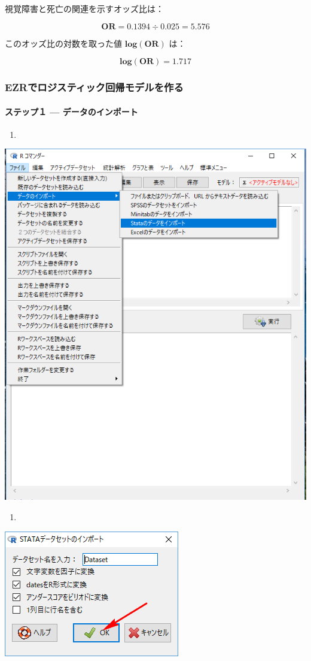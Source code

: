 \documentclass[11pt,]{problemset}
\let\oldparagraph\paragraph
\renewcommand{\paragraph}[1]{\oldparagraph{#1}\mbox{}}
\begin{document}
視覚障害と死亡の関連を示すオッズ比は：

\[
\mathbf{OR} = 0.1394 \div 0.025 = 5.576
\]

このオッズ比の対数を取った値 \(\mathbf{log(OR)}\) は：

\[
\mathbf{log(OR)} = 1.717
\]

\hypertarget{ezr}{%
\subsubsection{EZRでロジスティック回帰モデルを作る}\label{ezr}}

\hypertarget{-}{%
\paragraph{ステップ１ --- データのインポート}\label{-}}

\begin{enumerate}
\def\labelenumi{\arabic{enumi}.}
\item
\end{enumerate}

\begin{center}\includegraphics[width=0.5\linewidth]{pic/import00} \end{center}

\newpage
\vfill

\begin{enumerate}
\def\labelenumi{\arabic{enumi}.}
\setcounter{enumi}{1}
\item
\end{enumerate}

\begin{center}\includegraphics[width=0.3\linewidth]{pic/logstic01} \end{center}
\end{document}

